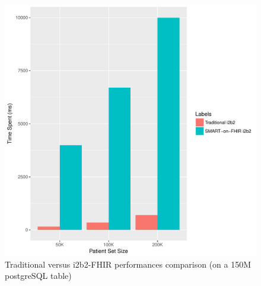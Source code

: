\documentclass{amia}
\begin{document}
\begin{figure}[h]
\centering
\includegraphics[scale=.7]{graph2.pdf}
	\caption{Traditional versus i2b2-FHIR performances comparison (on a 150M postgreSQL table)}
\label{fig1}
\end{figure}
\end{document}
